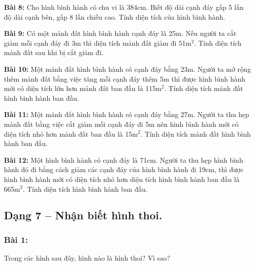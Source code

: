 \documentclass[11pt]{article}
\begin{document}
\textbf{Bài 8:} Cho hình bình hành có chu vi là 384cm. Biết độ dài cạnh đáy gấp 5 lần độ dài cạnh bên, gấp 8 lần chiều cao. Tính diện tích của hình bình hành.

\textbf{Bài 9:} Có một mảnh đất hình bình hành cạnh đáy là 25m. Nếu người ta cắt giảm mỗi cạnh đáy đi 3m thì diện tích mảnh đất giảm đi 51m$^2$. Tính diện tích mảnh đất sau khi bị cắt giảm đi.

\begin{center}
\end{center}

\textbf{Bài 10:} Một mảnh đất hình bình hành có cạnh đáy bằng 23m. Người ta mở rộng thêm mảnh đất bằng việc tăng mỗi cạnh đáy thêm 5m thì được hình bình hành mới có diện tích lớn hơn mảnh đất ban đầu là 115m$^2$. Tính diện tích mảnh đất hình bình hành ban đầu.

\textbf{Bài 11:} Một mảnh đất hình bình hành có cạnh đáy bằng 27m. Người ta thu hẹp mảnh đất bằng việc cắt giảm mỗi cạnh đáy đi 5m nên hình bình hành mới có diện tích nhỏ hơn mảnh đất ban đầu là 15m$^2$. Tính diện tích mảnh đất hình bình hành ban đầu.

\textbf{Bài 12:} Một hình bình hành có cạnh đáy là 71cm. Người ta thu hẹp hình bình hành đó đi bằng cách giảm các cạnh đáy của hình bình hành đi 19cm, thì được hình bình hành mới có diện tích nhỏ hơn diện tích hình bình hành ban đầu là 665m$^2$. Tính diện tích hình bình hành ban đầu.

\subsection*{Dạng 7 – Nhận biết hình thoi.}

\subsubsection*{Bài 1:} Trong các hình sau đây, hình nào là hình thoi? Vì sao?
\end{document}
